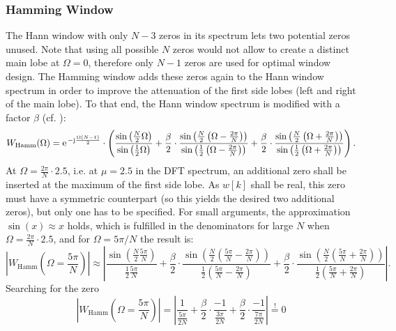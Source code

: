 \documentclass[11pt,a4paper,DIV=12]{scrartcl}
\begin{document}
\subsubsection{Hamming Window}
The Hann window with only $N-3$ zeros in its spectrum lets two potential
zeros unused.
%
Note that using all possible $N$ zeros would not allow to create a distinct main
lobe at $\Omega=0$, therefore only $N-1$ zeros are used for optimal window
design.
%
The Hamming window adds these zeros again to the Hann window spectrum in
order to improve the attenuation of the first side lobes (left and right of
the main lobe).
%
To that end, the Hann window spectrum is modified with a factor $\beta$ (cf.
\cite[Ch. 3.10]{Rabiner1975}):
%
\begin{equation}
W_{\text{Hamm}}(\Omega)=\e^{-\im\frac{\Omega(N-1)}{2}}\cdot\left(\frac{\sin\left(\frac{N}{2}\Omega\right)}{\sin\left(\frac{1}{2}\Omega\right)}+\frac{\beta}{2}\cdot\frac{\sin\left(\frac{N}{2}\left(\Omega-\frac{2\pi}{N}\right)\right)}{\sin\left(\frac{1}{2}\left(\Omega-\frac{2\pi}{N}\right)\right)}+\frac{\beta}{2}\cdot\frac{\sin\left(\frac{N}{2}\left(\Omega+\frac{2\pi}{N}\right)\right)}{\sin\left(\frac{1}{2}\left(\Omega+\frac{2\pi}{N}\right)\right)}\right).
\end{equation}
%
At $\Omega=\frac{2\pi}{N}\cdot2.5$, i.e. at $\mu=2.5$ in the DFT spectrum, an
additional zero shall be inserted at the maximum of the first side lobe.
%
As $w[k]$ shall be real, this zero must have a symmetric counterpart (so this
yields the desired two additional zeros), but only one has to be specified.
%
For small arguments, the approximation $\sin(x)\approx x$ holds, which is
fulfilled in the denominators for large $N$ when $\Omega=\frac{2\pi}{N}\cdot2.5$,
and for $\Omega=5\pi/N$ the result is:
%
\begin{equation}
\left|W_{\text{Hamm}}(\Omega=\frac{5\pi}{N})\right|\approx\left|\frac{\sin\left(\frac{N}{2}\frac{5\pi}{N}\right)}{\frac{1}{2}\frac{5\pi}{N}}+\frac{\beta}{2}\cdot\frac{\sin\left(\frac{N}{2}\left(\frac{5\pi}{N}-\frac{2\pi}{N}\right)\right)}{\frac{1}{2}\left(\frac{5\pi}{N}-\frac{2\pi}{N}\right)}+\frac{\beta}{2}\cdot\frac{\sin\left(\frac{N}{2}\left(\frac{5\pi}{N}+\frac{2\pi}{N}\right)\right)}{\frac{1}{2}\left(\frac{5\pi}{N}+\frac{2\pi}{N}\right)}\right|.
\end{equation}
%
Searching for the zero
%
\begin{equation}
\left|W_{\text{Hamm}}(\Omega=\frac{5\pi}{N})\right|=\left|\frac{1}{\frac{5\pi}{2N}}+\frac{\beta}{2}\cdot\frac{-1}{\frac{3\pi}{2N}}+\frac{\beta}{2}\cdot\frac{-1}{{\frac{7\pi}{2N}}}\right|\stackrel{!}{=}0
\end{equation}
\end{document}
